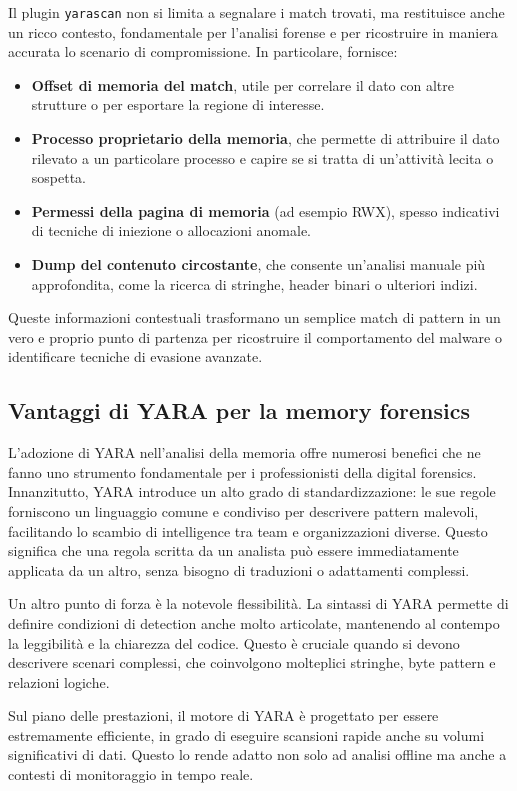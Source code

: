 Il plugin \texttt{yarascan} non si limita a segnalare i match trovati, ma restituisce anche un ricco contesto, fondamentale per l'analisi forense e per ricostruire in maniera accurata lo scenario di compromissione. In particolare, fornisce:
\begin{itemize}
  \item \textbf{Offset di memoria del match}, utile per correlare il dato con altre strutture o per esportare la regione di interesse.
  \item \textbf{Processo proprietario della memoria}, che permette di attribuire il dato rilevato a un particolare processo e capire se si tratta di un'attività lecita o sospetta.
  \item \textbf{Permessi della pagina di memoria} (ad esempio RWX), spesso indicativi di tecniche di iniezione o allocazioni anomale.
  \item \textbf{Dump del contenuto circostante}, che consente un'analisi manuale più approfondita, come la ricerca di stringhe, header binari o ulteriori indizi.
\end{itemize}
Queste informazioni contestuali trasformano un semplice match di pattern in un vero e proprio punto di partenza per ricostruire il comportamento del malware o identificare tecniche di evasione avanzate.


\subsection{Vantaggi di YARA per la memory forensics}

L'adozione di YARA nell'analisi della memoria offre numerosi benefici che ne fanno uno strumento fondamentale per i professionisti della digital forensics. Innanzitutto, YARA introduce un alto grado di standardizzazione: le sue regole forniscono un linguaggio comune e condiviso per descrivere pattern malevoli, facilitando lo scambio di intelligence tra team e organizzazioni diverse. Questo significa che una regola scritta da un analista può essere immediatamente applicata da un altro, senza bisogno di traduzioni o adattamenti complessi.

Un altro punto di forza è la notevole flessibilità. La sintassi di YARA permette di definire condizioni di detection anche molto articolate, mantenendo al contempo la leggibilità e la chiarezza del codice. Questo è cruciale quando si devono descrivere scenari complessi, che coinvolgono molteplici stringhe, byte pattern e relazioni logiche.

Sul piano delle prestazioni, il motore di YARA è progettato per essere estremamente efficiente, in grado di eseguire scansioni rapide anche su volumi significativi di dati. Questo lo rende adatto non solo ad analisi offline ma anche a contesti di monitoraggio in tempo reale.

